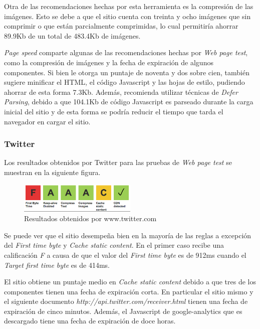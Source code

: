 Otra de las recomendaciones hechas por esta herramienta es la compresión de las imágenes. Esto se debe a que el sitio cuenta con treinta y ocho imágenes que sin
comprimir o que están parcialmente comprimidas, lo cual permitiría ahorrar 89.9Kb de un total de 483.4Kb de imágenes.

\emph{Page speed} comparte algunas de las recomendaciones hechas por \emph{Web page test}, como la compresión de imágenes y la fecha de expiración de algunos componentes.
Si bien le otorga un puntaje de noventa y dos sobre cien, también sugiere minificar el HTML, el código Javascript y las hojas de estilo, pudiendo ahorrar de esta forma 7.3Kb.
Además, recomienda utilizar técnicas de \emph{Defer Parsing}, debido a que 104.1Kb de código Javascript es parseado durante la carga inicial del sitio y de esta forma se podría reducir el tiempo que tarda el navegador en cargar el sitio.

\subsubsection{Twitter}

Los resultados obtenidos por Twitter para las pruebas de \emph{Web page test} se muestran en la siguiente figura.

\begin{figure}[h]
\centering
\includegraphics[width=0.5\textwidth]{figuras/lado_cliente/twitter/page_results.png}
  \caption{Resultados obtenidos por www.twitter.com}
    \label{fig.twitter_page_results}
\end{figure}

Se puede ver que el sitio desempeña bien en la mayoría de las reglas a excepción del \emph{First time byte} y \emph{Cache static content}. En el primer caso recibe una calificación \emph{F} a causa de que el valor del \emph{First time byte} es de 912ms cuando el \emph{Target first time byte} es de 414ms.

El sitio obtiene un puntaje medio en \emph{Cache static content} debido a que tres de los componentes tienen una fecha de expiración corta. En particular el
sitio mismo y el siguiente documento \emph{http://api.twitter.com/receiver.html} tienen una fecha de expiración de cinco minutos. Además, el Javascript de google-analytics
que es descargado tiene una fecha de expiración de doce horas.

